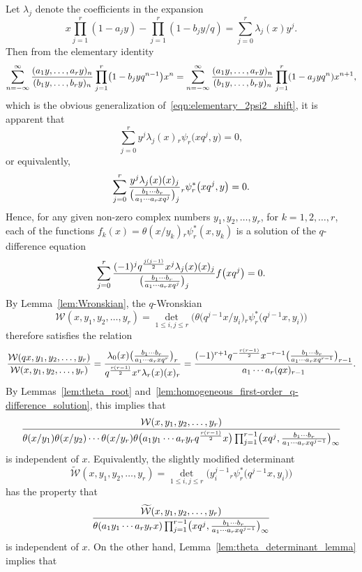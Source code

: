 \documentclass[10pt,a4paper]{amsart}
\numberwithin{equation}{section}
\begin{document}
Let $\lambda_j$ denote the coefficients in the expansion
\[ x\prod_{j=1}^r (1-a_jy) - \prod_{j=1}^r (1-b_j y/q)= \sum_{j=0}^r \lambda_j(x) y^j. \]
Then from the elementary identity
\[ \sum_{n=-\infty}^\infty {(a_1y,\dots,a_ry)_n \over (b_1y,\dots,b_ry)_n} \prod_{j=1}^r\bigl(1-b_jyq^{n-1}\bigr) x^n = \sum_{n=-\infty}^\infty {(a_1y,\dots,a_ry)_n \over (b_1y,\dots,b_ry)_n} \prod_{j=1}^r(1-a_jyq^n) x^{n+1}, \]
which is the obvious generalization of~\eqref{eqn:elementary_2psi2_shift}, it is apparent that
\[ \sum_{j=0}^r y^j \lambda_j(x) {}_r\psi_r\bigl(xq^j,y\bigr) = 0, \]
or equivalently,
\begin{equation} \label{eqn:rpsir_ast_linear_relation}
\sum_{j=0}^r {y^j \lambda_j(x) (x)_j \over \bigl({b_1\cdots b_r \over a_1\cdots a_r xq^j}\bigr)_j} {}_r^{}\psi_r^\ast\big(xq^j,y\big) = 0.
\end{equation}
Hence, for any given non-zero complex numbers $y_1, y_2, \dots, y_r$, for $k=1,2,\dots,r$, each of the functions $f_k(x) = \theta(x/y_k) {}_r^{}\psi_r^\ast(x,y_k)$ is a solution of the $q$-difference equation
\[ \sum_{j=0}^r {(-1)^j q^{j(j-1) \over 2} x^j \lambda_j(x) (x)_j \over \bigl({b_1\cdots b_r \over a_1\cdots a_r xq^j}\bigr)_j} f\bigl(xq^j\bigr) = 0. \]
By Lemma~\ref{lem:Wronskian}, the $q$-Wronskian
\[ \mathcal{W}(x,y_1,y_2,\dots,y_r) = \det_{1 \leq i,j \leq r}\bigl( \theta\bigl(q^{j-1}x/y_i\bigr) {}_r^{}\psi_r^\ast\bigl(q^{j-1}x,y_i\bigr) \bigr) \]
therefore satisfies the relation
\[ {\mathcal{W}(qx,y_1,y_2,\dots,y_r) \over \mathcal{W}(x,y_1,y_2,\dots,y_r)} = {\lambda_0(x) \bigl({b_1\cdots b_r \over a_1\cdots a_r xq^r}\bigr)_r \over q^{r(r-1) \over 2} x^r \lambda_r(x) (x)_r} = {(-1)^{r+1} q^{-{r(r-1) \over 2}} x^{-r-1} \bigl({b_1\cdots b_r \over a_1\cdots a_r xq^{r-1}}\bigr)_{r-1} \over a_1\cdots a_r (qx)_{r-1}}. \]
By Lemmas~\ref{lem:theta_root} and~\ref{lem:homogeneous_first-order_q-difference_solution}, this implies that
\[ {\mathcal{W}(x,y_1,y_2,\dots,y_r) \over \theta(x/y_1)\theta(x/y_2) \cdots \theta(x/y_r) \theta\bigl(a_1 y_1 \cdots a_r y_r q^{r(r-1) \over 2} x\bigr) \prod_{j=1}^{r-1} \bigl(xq^j,{b_1\cdots b_r \over a_1\cdots a_r x q^{j-1}}\bigr)_\infty} \]
is independent of $x$. Equivalently, the slightly modified determinant
\[ \widetilde{\mathcal{W}}(x,y_1,y_2,\dots,y_r) = \det_{1 \leq i,j \leq r}\bigl( y_i^{j-1} {}_r^{}\psi_r^\ast\bigl(q^{j-1}x,y_i\bigr) \bigr) \]
has the property that
\[ {\widetilde{\mathcal{W}}(x,y_1,y_2,\dots,y_r) \over \theta(a_1y_1\cdots a_ry_r x)\prod_{j=1}^{r-1} \bigl(xq^j,{b_1\cdots b_r \over a_1\cdots a_r x q^{j-1}}\bigr)_\infty} \]
is independent of $x$. On the other hand, Lemma~\ref{lem:theta_determinant_lemma} implies that
\end{document}
